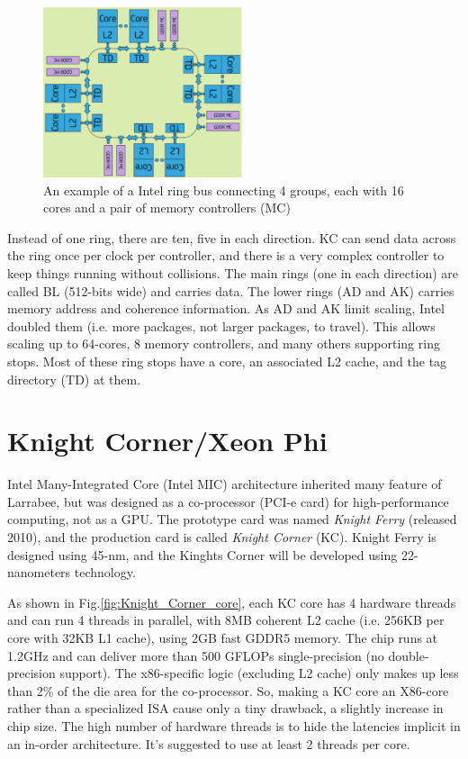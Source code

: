 \begin{figure}[hbt]
  \centerline{\includegraphics[height=5cm,
    angle=0]{./images/Intel_ringbus.eps}}
  \caption{An example of a Intel ring bus connecting 4 groups, each with 16
  cores and a pair of memory controllers (MC)}
  \label{fig:Intel_ringbus}
\end{figure}

\begin{framed}
Instead of one ring, there are ten, five in each direction. KC can send data
across the ring once per clock per controller, and there is a very complex
controller to keep things running without collisions. The main rings (one in
each direction) are called BL (512-bits wide) and carries data. The lower rings
(AD and AK) carries memory address and coherence information. As AD and AK limit
scaling, Intel doubled them (i.e. more packages, not larger packages, to
travel). This allows scaling up to 64-cores, 8 memory controllers, and many
others supporting ring stops. Most of these ring stops have a core, an
associated L2 cache, and the tag directory (TD) at them.
\end{framed}

\section{Knight Corner/Xeon Phi}
\label{sec:Knight-Corner-Intel-CPU}

Intel Many-Integrated Core (Intel MIC) architecture inherited many feature of
Larrabee, but was designed as a co-processor (PCI-e card) for high-performance
computing, not as a GPU. The prototype card was named {\it Knight Ferry}
(released 2010), and the production card is called {\it Knight Corner} (KC).
Knight Ferry is designed using 45-nm, and the Kinghts Corner will be
developed using 22-nanometers technology. 

As shown in Fig.\ref{fig:Knight_Corner_core}, each KC core has 4 hardware
threads and can run 4 threads in parallel, with 8MB coherent L2 cache (i.e.
256KB per core with 32KB L1 cache), using 2GB fast GDDR5 memory.
The chip runs at 1.2GHz and can deliver more than 500 GFLOPs single-precision
(no double-precision support). The x86-specific logic (excluding L2 cache) only
makes up less than 2\% of the die area for the co-processor. So, making a KC
core an X86-core rather than a specialized ISA cause only a tiny drawback, a
slightly increase in chip size. The high number of hardware threads is to hide
the latencies implicit in an in-order architecture. It's suggested to use at
least 2 threads per core.
 
